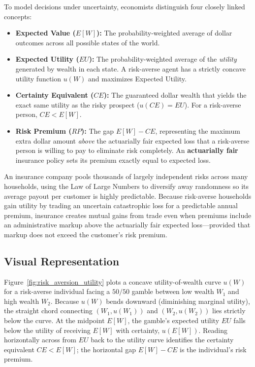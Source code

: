 \documentclass[11pt,letterpaper]{article}
\begin{document}
To model decisions under uncertainty, economists distinguish four closely linked concepts:
\begin{itemize}
    \item \textbf{Expected Value ($E[W]$):} The probability-weighted average of dollar outcomes across all possible states of the world.
    \item \textbf{Expected Utility ($EU$):} The probability-weighted average of the \emph{utility} generated by wealth in each state. A risk-averse agent has a strictly concave utility function $u(W)$ and maximizes Expected Utility.
    \item \textbf{Certainty Equivalent ($CE$):} The guaranteed dollar wealth that yields the exact same utility as the risky prospect ($u(CE) = EU$). For a risk-averse person, $CE < E[W]$.
    \item \textbf{Risk Premium ($RP$):} The gap $E[W] - CE$, representing the maximum extra dollar amount \emph{above} the actuarially fair expected loss that a risk-averse person is willing to pay to eliminate risk completely. An \textbf{actuarially fair} insurance policy sets its premium exactly equal to expected loss.
\end{itemize}

\begin{tcolorbox}[colback=yellow!10!white,colframe=orange!80!black,title=\textbf{Clear It Up: Why Insurance Companies Can Profit While Customers Benefit}]
An insurance company pools thousands of largely independent risks across many households, using the Law of Large Numbers to diversify away randomness so its average payout per customer is highly predictable. Because risk-averse households gain utility by trading an uncertain catastrophic loss for a predictable annual premium, insurance creates mutual gains from trade even when premiums include an administrative markup above the actuarially fair expected loss—provided that markup does not exceed the customer's risk premium.
\end{tcolorbox}

\subsection*{Visual Representation}
Figure~\ref{fig:risk_aversion_utility} plots a concave utility-of-wealth curve $u(W)$ for a risk-averse individual facing a $50/50$ gamble between low wealth $W_1$ and high wealth $W_2$. Because $u(W)$ bends downward (diminishing marginal utility), the straight chord connecting $(W_1, u(W_1))$ and $(W_2, u(W_2))$ lies strictly below the curve. At the midpoint $E[W]$, the gamble's expected utility $EU$ falls below the utility of receiving $E[W]$ with certainty, $u(E[W])$. Reading horizontally across from $EU$ back to the utility curve identifies the certainty equivalent $CE < E[W]$; the horizontal gap $E[W] - CE$ is the individual's risk premium.
\end{document}
